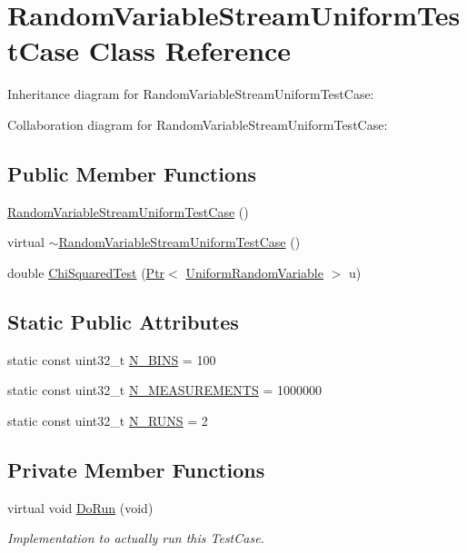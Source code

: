 \hypertarget{classRandomVariableStreamUniformTestCase}{}\section{Random\+Variable\+Stream\+Uniform\+Test\+Case Class Reference}
\label{classRandomVariableStreamUniformTestCase}


Inheritance diagram for Random\+Variable\+Stream\+Uniform\+Test\+Case\+:


Collaboration diagram for Random\+Variable\+Stream\+Uniform\+Test\+Case\+:
\subsection*{Public Member Functions}
\begin{DoxyCompactItemize}
\item 
\hyperlink{classRandomVariableStreamUniformTestCase_a70794abf4ab95bce5912c2659e7dd12d}{Random\+Variable\+Stream\+Uniform\+Test\+Case} ()
\item 
virtual \hyperlink{classRandomVariableStreamUniformTestCase_a7725e6e06f0cf45d30709ef24a08c1c5}{$\sim$\+Random\+Variable\+Stream\+Uniform\+Test\+Case} ()
\item 
double \hyperlink{classRandomVariableStreamUniformTestCase_ad54d3117255be7b5a8a79fced7d66d8a}{Chi\+Squared\+Test} (\hyperlink{classns3_1_1Ptr}{Ptr}$<$ \hyperlink{classns3_1_1UniformRandomVariable}{Uniform\+Random\+Variable} $>$ u)
\end{DoxyCompactItemize}
\subsection*{Static Public Attributes}
\begin{DoxyCompactItemize}
\item 
static const uint32\+\_\+t \hyperlink{classRandomVariableStreamUniformTestCase_ab9bd5ab207c7358f8425b7b4ca516c42}{N\+\_\+\+B\+I\+NS} = 100
\item 
static const uint32\+\_\+t \hyperlink{classRandomVariableStreamUniformTestCase_af698d1758a3c70dda2001f1b6d5b87b1}{N\+\_\+\+M\+E\+A\+S\+U\+R\+E\+M\+E\+N\+TS} = 1000000
\item 
static const uint32\+\_\+t \hyperlink{classRandomVariableStreamUniformTestCase_a12d6e3ab344655b6af2b31b5dcc043af}{N\+\_\+\+R\+U\+NS} = 2
\end{DoxyCompactItemize}
\subsection*{Private Member Functions}
\begin{DoxyCompactItemize}
\item 
virtual void \hyperlink{classRandomVariableStreamUniformTestCase_acd98890e6413349110a471847035892f}{Do\+Run} (void)
\begin{DoxyCompactList}\small\item\em Implementation to actually run this Test\+Case. \end{DoxyCompactList}\end{DoxyCompactItemize}
